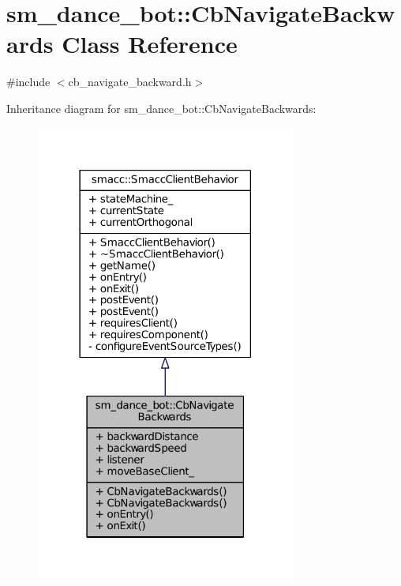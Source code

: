 \hypertarget{classsm__dance__bot_1_1CbNavigateBackwards}{}\section{sm\+\_\+dance\+\_\+bot\+:\+:Cb\+Navigate\+Backwards Class Reference}
\label{classsm__dance__bot_1_1CbNavigateBackwards}


{\ttfamily \#include $<$cb\+\_\+navigate\+\_\+backward.\+h$>$}



Inheritance diagram for sm\+\_\+dance\+\_\+bot\+:\+:Cb\+Navigate\+Backwards\+:
\nopagebreak
\begin{figure}[H]
\begin{center}
\leavevmode
\includegraphics[width=242pt]{classsm__dance__bot_1_1CbNavigateBackwards__inherit__graph}
\end{center}
\end{figure}


